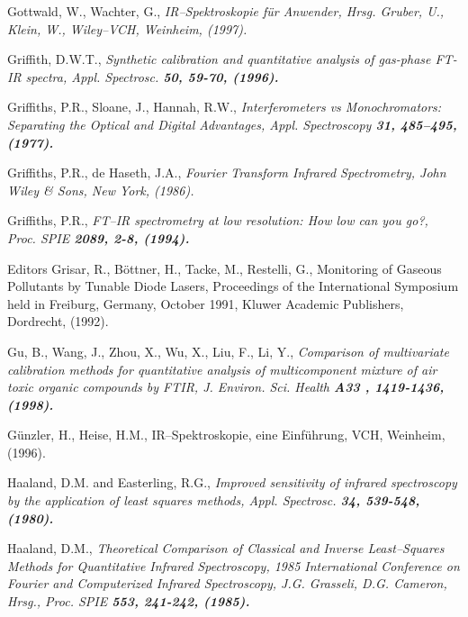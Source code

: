 \begin{thebibliography}{giese-bogdan,199797}
 Gottwald, W., Wachter, G.,
\it IR--Spektroskopie f\"{u}r Anwender\rm , Hrsg. Gruber, U., Klein,
W., Wiley--VCH, Weinheim, (1997).

 Griffith, D.W.T., \it Synthetic
calibration and quantitative analysis of gas-phase FT-IR
spectra\rm , Appl. Spectrosc. \bf 50\rm , 59-70, (1996).

 Griffiths, P.R., Sloane,
J., Hannah, R.W., \it Interferometers vs Monochromators:
Separating the Optical and Digital Advantages\rm , Appl.
Spectroscopy \bf 31\rm , 485--495, (1977).

 Griffiths, P.R., de Haseth, J.A.,
\it Fourier Transform Infrared Spectrometry\rm , John Wiley \&
Sons, New York, (1986).

 Griffiths, P.R., \it FT--IR
spectrometry at low resolution: How low can you go?\rm , Proc.
SPIE \bf 2089\rm , 2-8, (1994).

 Editors Grisar, R., B\"{o}ttner, H., Tacke,
M., Restelli, G., Monitoring of Gaseous Pollutants by Tunable
Diode Lasers, Proceedings of the International Symposium held in
Freiburg, Germany, October 1991, Kluwer Academic Publishers,
Dordrecht, (1992).

 Gu, B., Wang, J., Zhou, X., Wu, X., Liu, F., Li, Y.,
\it Comparison of multivariate calibration methods for
quantitative analysis of multicomponent mixture of air toxic
organic compounds by FTIR\rm , J. Environ. Sci. Health \bf A33\rm
, 1419-1436, (1998).

 G\"{u}nzler, H., Heise, H.M., IR--Spektroskopie,
eine Einf\"{u}hrung\rm , VCH, Weinheim, (1996).


 Haaland, D.M. and Easterling, R.G.,
\it Improved sensitivity of infrared spectroscopy by the
application of least squares methods\rm , Appl. Spectrosc. \bf
34\rm , 539-548, (1980).

 Haaland, D.M., \it Theoretical Comparison
of Classical and Inverse Least--Squares Methods for Quantitative
Infrared Spectroscopy\rm , 1985 International Conference on
Fourier and Computerized Infrared Spectroscopy, J.G. Grasseli,
D.G. Cameron, Hrsg., Proc. SPIE \bf 553\rm , 241-242, (1985).


\end{thebibliography}
